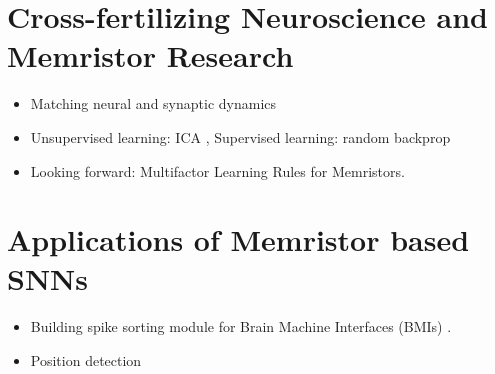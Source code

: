 \documentclass[english]{article}
\renewcommand{\cite}{\citep}
\begin{document}
\section{Cross-fertilizing Neuroscience and Memristor Research}
\begin{itemize}
  \item Matching neural and synaptic dynamics \cite{Neftci18_datapowe}
  \item Unsupervised learning: ICA \cite{Fouda_etal18_indecomp}, Supervised learning: random backprop \cite{Neftci_etal17_evenrand}
  \item Looking forward: Multifactor Learning Rules for Memristors. 
\end{itemize}

\section{Applications of Memristor based SNNs}
\begin{itemize}
  \item Building spike sorting module for Brain Machine Interfaces (BMIs) \cite{mukhopadhyay2018power}.
  \item Position detection \cite{ebong2012cmos}
\end{itemize}

 

\end{document}
